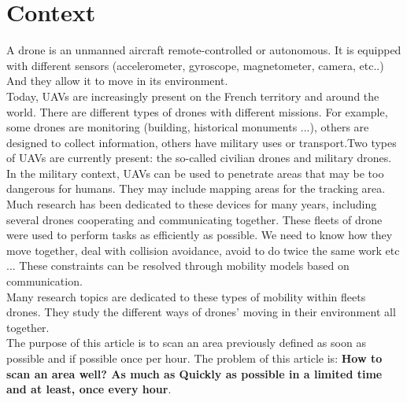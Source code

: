 \chapter{Context}

A drone is an unmanned aircraft remote-controlled or autonomous. It is equipped with different sensors (accelerometer, gyroscope, magnetometer, camera, etc..) And they allow it to move in its environment.\\

Today, UAVs are increasingly present on the French territory and around the world. There are different types of drones with different missions. For example, some drones are monitoring (building, historical monuments ...), others are designed to collect information, others have military uses or transport.Two types of UAVs are currently present: the so-called civilian drones and military drones. In the military context, UAVs can be used to penetrate areas that may be too dangerous for humans. They may include mapping areas for the tracking area.\\

Much research has been dedicated to these devices for many years, including several drones cooperating and communicating together. These fleets of drone were used to perform tasks as efficiently as possible. We need to know how they move together, deal with collision avoidance, avoid to do twice the same work etc ... These constraints can be resolved through mobility models based on communication.\\
Many research topics are dedicated to these types of mobility within fleets drones. They study the different ways of drones' moving in their environment all together.\\

The purpose of this article is to scan an area previously defined as soon as possible and if possible once per hour. The problem of this article is:
\textbf{How to scan an area well? As much as Quickly as possible in a limited time and at least, once every hour}.